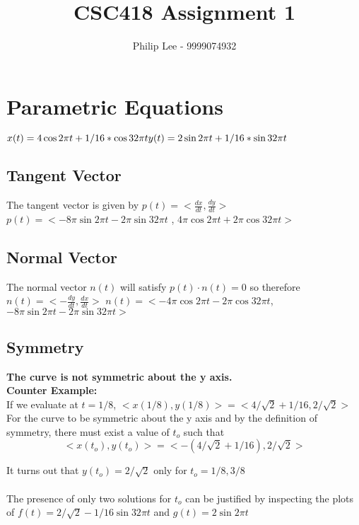 \documentclass[a4paper,10pt]{scrartcl}
\title{CSC418 Assignment 1}
\author{Philip Lee - 9999074932}
\begin{document}
\maketitle


\section{Parametric Equations}
$x(t) = 4\cos{2\pi t} + 1/16 * \cos{32\pi t} \\ y(t) = 2\sin{2\pi t} + 1/16 * \sin{32\pi t}$

\subsection{Tangent Vector}

The tangent vector is given by $p(t) = <\frac{dx}{dt}, \frac{dy}{dt}>$\\
$ p(t) = <-8\pi\sin{2\pi t} - 2\pi\sin{32\pi t}$ , $ 4\pi\cos{2\pi t} + 2\pi\cos{32\pi t}>$

\subsection{Normal Vector}

The normal vector $n(t)$ will satisfy $p(t) \cdot n(t) = 0$ so therefore $n(t) = <- \frac{dy}{dt}, \frac{dx}{dt}>$
$ n(t) =  < - 4\pi\cos{2\pi t} - 2\pi\cos{32\pi t}$, $-8\pi\sin{2\pi t} - 2\pi\sin{32\pi t}>$

\subsection{Symmetry}

{\bfseries The curve is not symmetric about the y axis.}\\

{\bfseries Counter Example:}\\

If we evaluate at $t = 1/8$,  $<x(1/8), y(1/8)> = <4/\sqrt{2} + 1/16, 2/\sqrt{2}>$\\
For the curve to be symmetric about the y axis and by the definition of symmetry,
there must exist a value of $t_o$ such that
\[<x(t_o), y(t_o)> = <-(4/\sqrt{2} + 1/16), 2/\sqrt{2}>\] 

It turns out that $y(t_o) = 2/\sqrt{2}$ only for $t_o = 1/8, 3/8$ \\\\
The presence of only two solutions for $t_o$ can be justified by inspecting
the plots of $f(t) = 2/\sqrt{2} - 1/16\sin{32\pi t}$ and $g(t) = 2\sin{2\pi t}$\\
\end{document}
